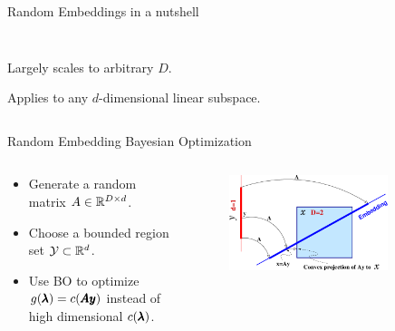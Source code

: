 \begin{frame}[c]{Random Embeddings in a nutshell}
\begin{itemize}
\begin{columns}[T]
\begin{column}{0.5\linewidth}
\begin{figure}
    \end{figure}
    \end{column}
\end{columns}
    \pause
\begin{columns}
\begin{column}{0.45\linewidth}
    \vspace{-8em}
    \item Largely scales to arbitrary $D$.
    \item Applies to any $d$-dimensional linear subspace.
\end{column}
\begin{column}{0.5\linewidth}

\end{column}
\end{columns}
\end{itemize}


\end{frame}

\begin{frame}[c]{Random Embedding Bayesian Optimization}
\begin{columns}[T]
\begin{column}{0.5\textwidth}
\begin{itemize}
    \item Generate a random matrix $A \in \mathbb{R}^{D \times d}$.
    \pause
    \item Choose a bounded region set $\mathcal{Y}\subset\mathbb{R}^d$.
    \pause
    \item Use BO to optimize $g(\pmb{\lambda})=c(\pmb{Ay})$ instead of high dimensional $c(\pmb{\lambda})$.
\end{itemize}
\end{column}
\begin{column}{0.5\textwidth}
\begin{figure}
    \includegraphics[width=0.8\textwidth]{w06_hpo_bo/images/highdim_images/Embedding.png}
\end{figure}
\end{column}

\end{columns} 
\end{frame}

